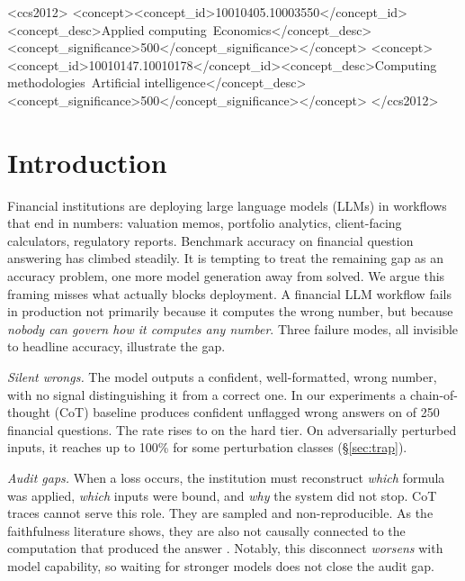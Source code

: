 \begin{CCSXML}
<ccs2012>
<concept><concept_id>10010405.10003550</concept_id><concept_desc>Applied computing~Economics</concept_desc><concept_significance>500</concept_significance></concept>
<concept><concept_id>10010147.10010178</concept_id><concept_desc>Computing methodologies~Artificial intelligence</concept_desc><concept_significance>500</concept_significance></concept>
</ccs2012>
\end{CCSXML}

\maketitle

\section{Introduction}
Financial institutions are deploying large language models (LLMs) in workflows that end in numbers: valuation memos, portfolio analytics, client-facing calculators, regulatory reports.
Benchmark accuracy on financial question answering has climbed steadily.
It is tempting to treat the remaining gap as an accuracy problem, one more model generation away from solved.
We argue this framing misses what actually blocks deployment.
A financial LLM workflow fails in production not primarily because it computes the wrong number, but because \emph{nobody can govern how it computes any number}.
Three failure modes, all invisible to headline accuracy, illustrate the gap.

\emph{Silent wrongs.}
The model outputs a confident, well-formatted, wrong number, with no signal distinguishing it from a correct one.
In our experiments a chain-of-thought (CoT) baseline produces confident unflagged wrong answers on \cotSWRAll{} of 250 financial questions.
The rate rises to \cotSWRHard{} on the hard tier.
On adversarially perturbed inputs, it reaches up to 100\% for some perturbation classes (\S\ref{sec:trap}).

\emph{Audit gaps.}
When a loss occurs, the institution must reconstruct \emph{which} formula was applied, \emph{which} inputs were bound, and \emph{why} the system did not stop.
CoT traces cannot serve this role.
They are sampled and non-reproducible.
As the faithfulness literature shows, they are also not causally connected to the computation that produced the answer \cite{turpin2023language,lanham2023measuring}.
Notably, this disconnect \emph{worsens} with model capability, so waiting for stronger models does not close the audit gap.

